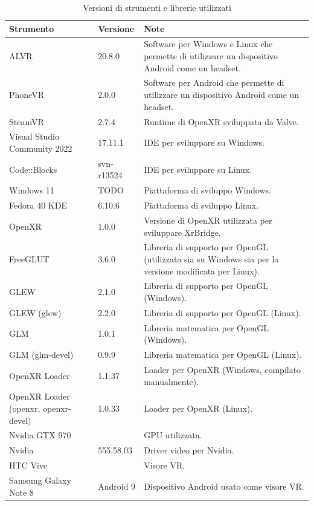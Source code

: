 \documentclass[twoside]{supsistudent}
\begin{document}
\begin{table}[H]
  \caption{Versioni di strumenti e librerie utilizzati}
  \begin{center}
    \begin{tabular}{ m{4cm} m{2cm} m{7cm} }
      Strumento & Versione & Note \\
      \hline
      ALVR & 20.8.0 & Software per Windows e Linux che permette di utilizzare un dispositivo Android come un headset. \\
      PhoneVR & 2.0.0 & Software per Android che permette di utilizzare un dispositivo Android come un headset. \\
      SteamVR & 2.7.4 & Runtime di OpenXR sviluppata da Valve. \\
      Visual Studio Community 2022 & 17.11.1 & IDE per sviluppare su Windows. \\
      Code::Blocks & svn-r13524 & IDE per sviluppare su Linux. \\
      Windows 11 & TODO & Piattaforma di sviluppo Windows. \\
      Fedora 40 KDE & 6.10.6 & Piattaforma di sviluppo Linux. \\
      OpenXR & 1.0.0 & Versione di OpenXR utilizzata per sviluppare XrBridge. \\
      FreeGLUT & 3.6.0 & Libreria di supporto per OpenGL (utilizzata sia su Windows sia per la versione modificata per Linux). \\
      GLEW & 2.1.0 & Libreria di supporto per OpenGL (Windows). \\
      GLEW (glew) & 2.2.0 & Libreria di supporto per OpenGL (Linux). \\
      GLM & 1.0.1 & Libreria matematica per OpenGL (Windows).\\
      GLM (glm-devel) & 0.9.9 & Libreria matematica per OpenGL (Linux). \\
      OpenXR Loader & 1.1.37 & Loader per OpenXR (Windows, compilato manualmente). \\
      OpenXR Loader (openxr, openxr-devel) & 1.0.33 & Loader per OpenXR (Linux). \\
      Nvidia GTX 970 & & GPU utilizzata. \\
      Nvidia & 555.58.03 & Driver video per Nvidia. \\
      HTC Vive & & Visore VR. \\
      Samsung Galaxy Note 8 & Android 9 & Dispositivo Android usato come visore VR. \\
    \end{tabular}
  \end{center}
\end{table}
\end{document}
